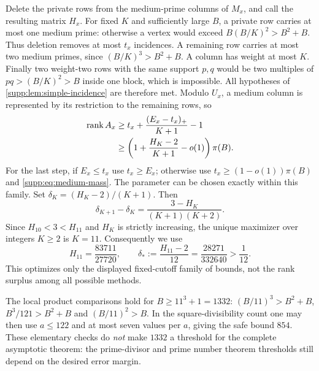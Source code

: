 Delete the private rows from the medium-prime columns of $M_x$, and
call the resulting matrix $H_x$. For fixed $K$ and sufficiently large
$B$, a private row carries at most one medium prime: otherwise a vertex
would exceed $B(B/K)^2>B^2+B$. Thus deletion removes at most $t_x$
incidences. A remaining row carries at most two medium primes, since
$(B/K)^3>B^2+B$. A column has weight at most $K$.
Finally two weight-two rows with the same support $p,q$ would be two
multiples of $pq>(B/K)^2>B$ inside one block, which is impossible.
All hypotheses of \cref{supp:lem:simple-incidence} are therefore met.
Modulo $U_x$, a medium column is represented by its restriction to the
remaining rows, so
\begin{align}\label{supp:eq:surplus-K}
 \operatorname{rank} A_x
 &\ge t_x+\frac{(E_x-t_x)_+}{K+1}-1\notag\\
 &\ge \left(1+\frac{H_K-2}{K+1}-o(1)\right)\pi(B).
\end{align}
For the last step, if $E_x\le t_x$ use $t_x\ge E_x$; otherwise use
$t_x\ge(1-o(1))\pi(B)$ and \eqref{supp:eq:medium-mass}.
The parameter can be chosen exactly within this family. Set
$\delta_K=(H_K-2)/(K+1)$. Then
\[
 \delta_{K+1}-\delta_K
   =\frac{3-H_K}{(K+1)(K+2)}.
\]
Since $H_{10}<3<H_{11}$ and $H_K$ is strictly increasing, the unique
maximizer over integers $K\ge2$ is $K=11$. Consequently we use
\[
 H_{11}=\frac{83711}{27720},\qquad
 \delta_*:=\frac{H_{11}-2}{12}
          =\frac{28271}{332640}>\frac1{12}.
\]
This optimizes only the displayed fixed-cutoff family of bounds,
not the rank surplus among all possible methods.

The local product comparisons hold for $B\ge11^3+1=1332$:
$(B/11)^3>B^2+B$, $B^3/121>B^2+B$ and $(B/11)^2>B$.
In the square-divisibility count one may then use $a\le122$ and at most
seven values per $a$, giving the safe bound $854$. These elementary
checks do \emph{not} make $1332$ a threshold for the complete asymptotic
theorem: the prime-divisor and prime number theorem thresholds still
depend on the desired error margin.

